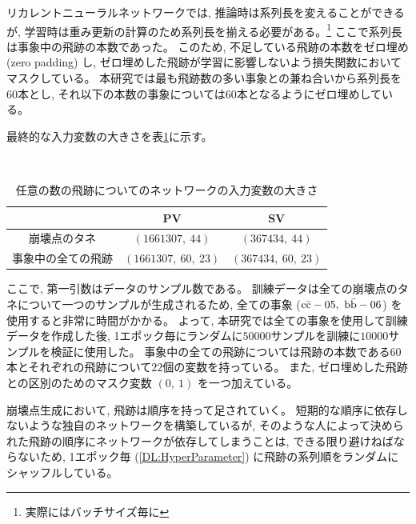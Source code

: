 リカレントニューラルネットワークでは, 推論時は系列長を変えることができるが, 学習時は重み更新の計算のため系列長を揃える必要がある。\footnote{実際にはバッチサイズ毎に}
ここで系列長は事象中の飛跡の本数であった。
このため, 不足している飛跡の本数をゼロ埋め (zero padding) し, ゼロ埋めした飛跡が学習に影響しないよう損失関数においてマスクしている。
本研究では最も飛跡数の多い事象との兼ね合いから系列長を$60$本とし, それ以下の本数の事象については$60$本となるようにゼロ埋めしている。

最終的な入力変数の大きさを表\ref{VLSTMInputParameterShape}に示す。

\begin{table}[htb]
 \centering
　\small
  \caption{任意の数の飛跡についてのネットワークの入力変数の大きさ}
  \begin{tabular}{c | c c}\hline
    & PV & SV\\\hline
    崩壊点のタネ & $(1661307,\ 44)$ & $(367434,\ 44)$\\
    事象中の全ての飛跡 & $(1661307,\ 60,\ 23)$ & $(367434,\ 60,\ 23)$\\\hline
  \end{tabular}
  \label{VLSTMInputParameterShape}
\end{table}

ここで, 第一引数はデータのサンプル数である。
訓練データは全ての崩壊点のタネについて一つのサンプルが生成されるため, 全ての事象 ($\rm c\bar{c}-05,\ \rm b\bar{b}-06$) を使用すると非常に時間がかかる。
よって, 本研究では全ての事象を使用して訓練データを作成した後, 1エポック毎にランダムに$50000$サンプルを訓練に$10000$サンプルを検証に使用した。
事象中の全ての飛跡については飛跡の本数である$60$本とそれぞれの飛跡について$22$個の変数を持っている。
また, ゼロ埋めした飛跡との区別のためのマスク変数 $(0,\ 1)$ を一つ加えている。

崩壊点生成において, 飛跡は順序を持って足されていく。
短期的な順序に依存しないような独自のネットワークを構築しているが, そのような人によって決められた飛跡の順序にネットワークが依存してしまうことは, できる限り避けねばならないため, 1エポック毎 (\ref{DL:HyperParameter}) に飛跡の系列順をランダムにシャッフルしている。

